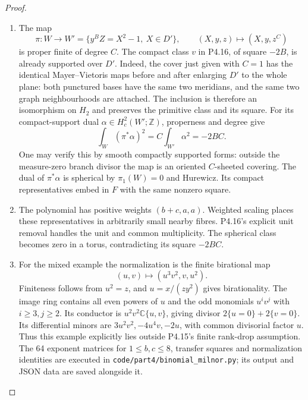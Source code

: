 \begin{proof}
\begin{enumerate}[label={$\langle1\rangle$\arabic*.},leftmargin=*]
\item The map
\[
 \pi:W\longrightarrow W'=\{y^BZ=X^2-1,\ X\in D'\},
 \qquad (X,y,z)\longmapsto(X,y,z^C)
\]
is proper finite of degree $C$. The compact class $v$ in
P4.16, of square $-2B$, is already supported over $D'$.
Indeed, the cover just given with $C=1$ has the identical
Mayer--Vietoris maps before and after enlarging $D'$ to the
whole plane: both punctured bases have the same two meridians,
and the same two graph neighbourhoods are attached. The
inclusion is therefore an isomorphism on $H_2$ and preserves
the primitive class and its square.
For its compact-support dual $\alpha\in H_c^2(W';\mathbb Z)$,
properness and degree give
\[
 \int_W(\pi^*\alpha)^2=C\int_{W'}\alpha^2=-2BC.
\]
One may verify this by smooth compactly supported forms:
outside the measure-zero branch divisor the map is an oriented
$C$-sheeted covering. The dual of $\pi^*\alpha$ is spherical
by $\pi_1(W)=0$ and Hurewicz. Its compact representatives
embed in $F$ with the same nonzero square.

\item The polynomial has positive weights $(b+c,a,a)$. Weighted
scaling places these representatives in arbitrarily small
nearby fibres. P4.16's explicit unit removal handles the unit
and common multiplicity. The spherical class becomes zero
in a torus, contradicting its square $-2BC$.

\item For the mixed example the normalization is the finite
birational map
\[
 (u,v)\longmapsto(u^3v^2,v,u^2).
\]
Finiteness follows from $u^2=z$, and $u=x/(zy^2)$ gives
birationality. The image ring contains all even powers of $u$
and the odd monomials $u^iv^j$ with $i\geq3,j\geq2$.
Its conductor is $u^2v^2\mathbb C\{u,v\}$, giving divisor
$2\{u=0\}+2\{v=0\}$. Its differential minors are
$3u^2v^2,-4u^4v,-2u$, with common divisorial factor $u$.
Thus this example explicitly lies outside P4.15's finite
rank-drop assumption. The 64 exponent matrices for
$1\leq b,c\leq8$, transfer squares and normalization
identities are executed in
\texttt{code/part4/binomial\_milnor.py}; its output and
JSON data are saved alongside it.

\end{enumerate}
\end{proof}